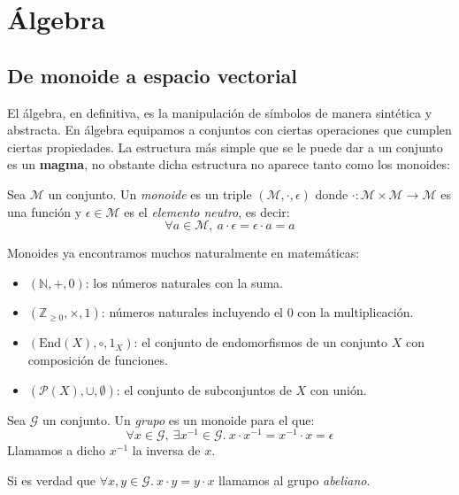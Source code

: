 \documentclass[10pt]{article}
\newcommand{\N}{\mathbb{N}}
\newcommand{\Z}{\mathbb{Z}}
\begin{document}
\newpage

\section{Álgebra}

\subsection{De monoide a espacio vectorial}

El álgebra, en definitiva, es la manipulación de símbolos de manera sintética y abstracta. En álgebra equipamos a conjuntos
con ciertas operaciones que cumplen ciertas propiedades. La estructura más simple que se le puede dar a un conjunto es un
\textbf{magma}, no obstante dicha estructura no aparece tanto como los monoides:

\begin{definition}[Monoide]
  Sea $ \mathcal{M} $ un conjunto. Un \textit{monoide} es un triple $ \left(\mathcal{M}, \cdot, \epsilon \right) $ donde
  $ \cdot : \mathcal{M} \times \mathcal{M} \to \mathcal{M} $ es una función y $ \epsilon \in \mathcal{M} $ es el 
  \textit{elemento neutro}, es decir:
  \[ \forall a \in \mathcal{M}, \ a \cdot \epsilon = \epsilon \cdot a = a \]
\end{definition}

\begin{example}[Monoides]
  Monoides ya encontramos muchos naturalmente en matemáticas:
  \begin{itemize}
    \item $(\N, +, 0)$: los números naturales con la suma.
    \item $(\Z_{\ge 0}, \times, 1)$: números naturales incluyendo el 0 con la multiplicación.
    \item $(\text{End}(X), \circ, 1_X)$: el conjunto de endomorfismos de un conjunto $X$ con composición de funciones.
    \item $(\mathcal{P}(X), \cup, \emptyset)$: el conjunto de subconjuntos de $X$ con unión.
  \end{itemize}
\end{example}

\begin{definition}[Grupos]
  Sea $ \mathcal{G} $ un conjunto. Un \textit{grupo} es un monoide para el que: 
  \[ \forall x \in \mathcal{G}, \ \exists x^{-1} \in \mathcal{G}. \ x \cdot x^{-1} = x^{-1} \cdot x = \epsilon \]
  Llamamos a dicho $ x^{-1} $ la inversa de $ x $.

  Si es verdad que $ \forall x, y \in \mathcal{G}.\ x \cdot y = y \cdot x $ llamamos al grupo \textit{abeliano}.
\end{definition}
\end{document}
